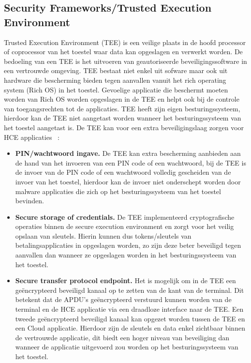 \subsection{Security Frameworks/Trusted Execution Environment}
\label{subsec:TEE}
Trusted Execution Environment (TEE) is een veilige plaats in de hoofd processor of coprocessor van het toestel waar data kan opgeslagen en verwerkt worden. De bedoeling van een TEE is het uitvoeren van geautoriseerde beveiligingssoftware in een vertrouwde omgeving. TEE bestaat niet enkel uit sofware maar ook uit hardware die bescherming bieden tegen aanvallen vanuit het rich operating system (Rich OS) in het toestel. Gevoelige applicatie die beschermt moeten worden van Rich OS worden opgeslagen in de TEE en helpt ook bij de controle van toegangsrechten tot de applicaties. TEE heeft zijn eigen besturingssysteem, hierdoor kan de TEE niet aangetast worden wanneer het besturingssysteem van het toestel aangetast is. De TEE kan voor een extra beveiligingslaag zorgen voor HCE applicaties ~\autocite{SCA2014}:

\begin{itemize}
	\item \textbf{PIN/wachtwoord ingave.} De TEE kan extra bescherming aanbieden aan de hand van het invoeren van een PIN code of een wachtwoord, bij de TEE is de invoer van de PIN code of een wachtwoord volledig gescheiden van de invoer van het toestel, hierdoor kan de invoer niet onderschept worden door malware applicaties die zich op het besturingssysteem van het toestel bevinden.
	
	\item \textbf{Secure storage of credentials.} De TEE implementeerd cryptografische operaties binnen de secure execution environment en zorgt voor het veilig opslaan van sleutels. Hierin kunnen dus tokens/sleutels van betalingsapplicaties in opgeslagen worden, zo zijn deze beter beveiligd tegen aanvallen dan wanneer ze opgeslagen worden in het besturingssysteem van het toestel.
	
	\item \textbf{Secure transfer protocol endpoint.} Het is mogelijk om in de TEE een geëncrypteerd beveiligd kanaal op te zetten van de kant van de terminal. Dit betekent dat de APDU's geëncrypteerd verstuurd kunnen worden van de terminal en de HCE applicatie via een draadloze interface naar de TEE. Een tweede geëncrypteerd beveiligd kanaal kan opgezet worden tussen de TEE en een Cloud applicatie. Hierdoor zijn de sleutels en data enkel zichtbaar binnen de vertrouwde applicatie, dit biedt een hoger niveau van beveiliging dan wanneer de applicatie uitgevoerd zou worden op het besturingssysteem van het toestel.
\end{itemize}

